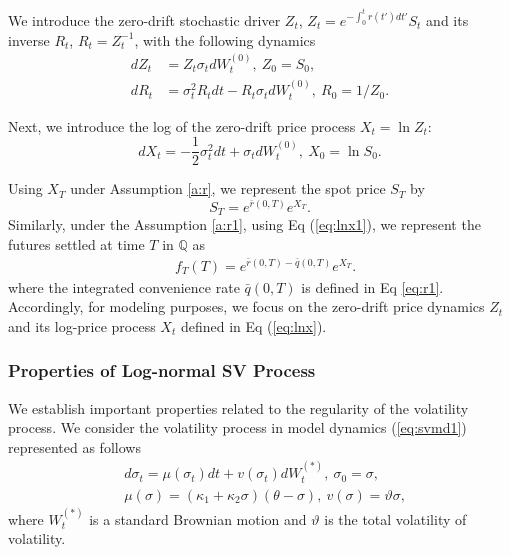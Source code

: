 \documentclass[pdftex,11pt,a4paper] {article}
\begin{document}
We introduce the zero-drift stochastic driver $Z_t$, $Z_t = e^{ - \int^{t}_{0}r(t') dt'}S_{t}$ and its inverse $R_t$, $R_t = Z^{-1}_{t}$, with the following dynamics
\begin{equation} \label{eq:zr}
\begin{split}
dZ_{t}&= Z_t\sigma_{t}dW^{(0)}_{t}, \ Z_0 =S_{0},\\
dR_{t}&= \sigma^{2}_{t}R_{t}dt-R_{t}\sigma_{t}dW^{(0)}_{t}, \ R_{0} =1/Z_{0}.
\end{split}
\end{equation}

Next, we introduce the log of the zero-drift price process $X_t = \ln Z_t$:
\begin{equation} \label{eq:lnx}
dX_{t}= -\frac{1}{2}\sigma^{2}_{t}dt+\sigma_{t}dW^{(0)}_{t}, \ X_{0} =\ln S_{0}.
\end{equation}


Using $X_{T}$ under Assumption \ref{a:r}, we represent the spot price $S_{T}$ by
\begin{equation} \label{eq:lnx1}
S_{T} = e^{\bar{r}(0, T)} e^{X_{T}}.
\end{equation}
Similarly, under the Assumption \ref{a:r1}, using Eq (\ref{eq:lnx1}), we represent the futures settled at time $T$ in $\mathbb{Q}$ as
\begin{equation} \label {eq:qt}
\begin{split}
& f_{T}(T) = e^{\bar{r}(0, T)-\bar{q}(0, T)} e^{X_{T}}.
\end{split}
\end{equation}
where the integrated convenience rate $\bar{q}(0, T)$ is defined in Eq \eqref{eq:r1}. Accordingly, for modeling purposes, we focus on the zero-drift price dynamics $Z_{t}$ and its log-price process $X_{t}$ defined in Eq (\ref{eq:lnx}). 


\subsubsection{Properties of Log-normal SV Process}\label{sec:vol_process}

We establish important properties related to the regularity of the volatility process. We consider the volatility process in model dynamics (\ref{eq:svmd1}) represented as follows
\begin{equation} \label{eq:pm1}
\begin{split}
& d\sigma_{t} =\mu(\sigma_{t})dt + v(\sigma_{t}) dW^{(*)}_{t}, \ \sigma_{0}=\sigma,\\
& \mu(\sigma)=\left(\kappa_{1} + \kappa_{2}\sigma \right)(\theta - \sigma), \  v(\sigma)  =\vartheta \sigma,
\end{split}
\end{equation}
where $W^{(*)}_{t}$ is a standard Brownian motion and $\vartheta$ is the total volatility of volatility.
\end{document}
